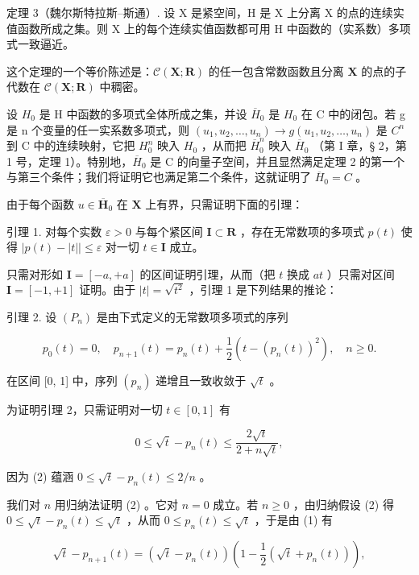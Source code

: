 定理 3（魏尔斯特拉斯–斯通）. 设 X 是紧空间，H 是 X 上分离 X 的点的连续实值函数所成之集。则 X 上的每个连续实值函数都可用 H 中函数的（实系数）多项式一致逼近。

这个定理的一个等价陈述是：\(\mathcal{C}(\mathbf{X};\mathbf{R})\) 的任一包含常数函数且分离 \(\mathbf{X}\) 的点的子代数在 \(\mathcal{C}(\mathbf{X};\mathbf{R})\) 中稠密。

设 \(H_{0}\) 是 H 中函数的多项式全体所成之集，并设 \(\overline{H}_{0}\) 是 \(H_{0}\) 在 C 中的闭包。若 g 是 n 个变量的任一实系数多项式，则 \((u_{1}, u_{2}, \ldots, u_{n}) \to g(u_{1}, u_{2}, \ldots, u_{n})\) 是 \(C^{n}\) 到 C 中的连续映射，它把 \(H_{0}^{n}\) 映入 \(H_{0}\) ，从而把 \(\overline{H}_{0}^{n}\) 映入 \(\overline{H}_{0}\) （第 I 章，§ 2，第 1 号，定理 1）。特别地，\(\overline{H}_{0}\) 是 C 的向量子空间，并且显然满足定理 2 的第一个与第三个条件；我们将证明它也满足第二个条件，这就证明了 \(\overline{H}_{0} = C\) 。

由于每个函数 \(u \in \overline{\mathbf{H}}_0\) 在 \(\mathbf{X}\) 上有界，只需证明下面的引理：

引理 1. 对每个实数 \(\varepsilon > 0\) 与每个紧区间 \(\mathbf{I} \subset \mathbf{R}\) ，存在无常数项的多项式 \(p(t)\) 使得 \(|p(t) - |t|| \leqslant \varepsilon\) 对一切 \(t \in \mathbf{I}\) 成立。

只需对形如 \(\mathbf{I} = [-a, +a]\) 的区间证明引理，从而（把 \(t\) 换成 \(at\) ）只需对区间 \(\mathbf{I} = [-1, +1]\) 证明。由于 \(|t| = \sqrt{t^2}\) ，引理 1 是下列结果的推论：

引理 2. 设 \((P_n)\) 是由下式定义的无常数项多项式的序列

\[
p _ {0} (t) = 0, \quad p _ {n + 1} (t) = p _ {n} (t) + \frac {1}{2} (t - (p _ {n} (t)) ^ {2}), \quad n \geqslant 0.\tag{1}
\]

在区间 {[}0, 1{]} 中，序列 \((p_n)\) 递增且一致收敛于 \(\sqrt{t}\) 。

为证明引理 2，只需证明对一切 \(t \in [0, 1]\) 有

\[
0 \leqslant \sqrt {t} - p _ {n} (t) \leqslant \frac {2 \sqrt {t}}{2 + n \sqrt {t}},\tag{2}
\]

因为 (2) 蕴涵 \(0 \leqslant \sqrt{t} - p_n(t) \leqslant 2 / n\) 。

我们对 \(n\) 用归纳法证明 (2) 。它对 \(n = 0\) 成立。若 \(n \geqslant 0\) ，由归纳假设 (2) 得 \(0 \leqslant \sqrt{t} - p_n(t) \leqslant \sqrt{t}\) ，从而 \(0 \leqslant p_n(t) \leqslant \sqrt{t}\) ，于是由 (1) 有

\[
\sqrt {t} - p _ {n + 1} (t) = (\sqrt {t} - p _ {n} (t)) \left(1 - \frac {1}{2} (\sqrt {t} + p _ {n} (t))\right),
\]

